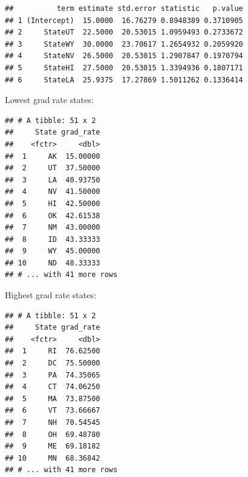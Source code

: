 \documentclass[]{article}
\newenvironment{Shaded}{\begin{snugshade}}{\end{snugshade}}
\newcommand{\KeywordTok}[1]{\textcolor[rgb]{0.13,0.29,0.53}{\textbf{#1}}}
\newcommand{\DataTypeTok}[1]{\textcolor[rgb]{0.13,0.29,0.53}{#1}}
\newcommand{\StringTok}[1]{\textcolor[rgb]{0.31,0.60,0.02}{#1}}
\newcommand{\CommentTok}[1]{\textcolor[rgb]{0.56,0.35,0.01}{\textit{#1}}}
\newcommand{\OperatorTok}[1]{\textcolor[rgb]{0.81,0.36,0.00}{\textbf{#1}}}
\newcommand{\NormalTok}[1]{#1}
\begin{document}
\begin{verbatim}
##          term estimate std.error statistic   p.value
## 1 (Intercept)  15.0000  16.76279 0.8948389 0.3710905
## 2     StateUT  22.5000  20.53015 1.0959493 0.2733672
## 3     StateWY  30.0000  23.70617 1.2654932 0.2059920
## 4     StateNV  26.5000  20.53015 1.2907847 0.1970794
## 5     StateHI  27.5000  20.53015 1.3394936 0.1807171
## 6     StateLA  25.9375  17.27869 1.5011262 0.1336414
\end{verbatim}

Lowest grad rate states:

\begin{Shaded}
\end{Shaded}

\begin{verbatim}
## # A tibble: 51 x 2
##     State grad_rate
##    <fctr>     <dbl>
##  1     AK  15.00000
##  2     UT  37.50000
##  3     LA  40.93750
##  4     NV  41.50000
##  5     HI  42.50000
##  6     OK  42.61538
##  7     NM  43.00000
##  8     ID  43.33333
##  9     WY  45.00000
## 10     ND  48.33333
## # ... with 41 more rows
\end{verbatim}

Highest grad rate states:

\begin{Shaded}
\end{Shaded}

\begin{verbatim}
## # A tibble: 51 x 2
##     State grad_rate
##    <fctr>     <dbl>
##  1     RI  76.62500
##  2     DC  75.50000
##  3     PA  74.35065
##  4     CT  74.06250
##  5     MA  73.87500
##  6     VT  73.66667
##  7     NH  70.54545
##  8     OH  69.48780
##  9     ME  69.18182
## 10     MN  68.36842
## # ... with 41 more rows
\end{verbatim}
\end{document}
